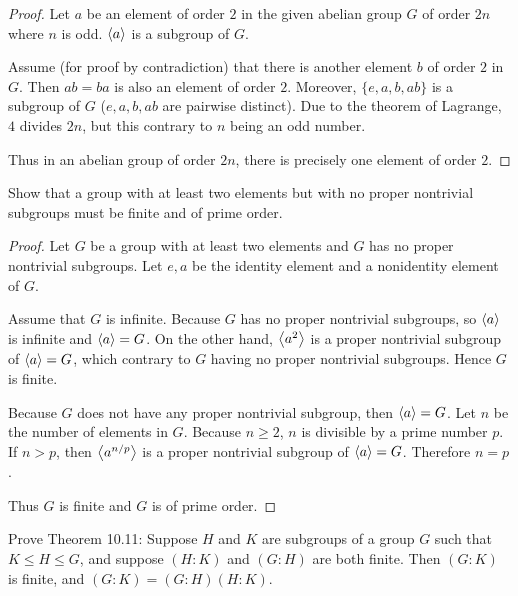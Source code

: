 \begin{proof}
    Let $a$ be an element of order $2$ in the given abelian group $G$ of order $2n$ where $n$ is odd. $\left\langle{a}\right\rangle$ is a subgroup of $G$.

    Assume (for proof by contradiction) that there is another element $b$ of order $2$ in $G$. Then $ab = ba$ is also an element of order $2$. Moreover, $\{ e, a, b, ab \}$ is a subgroup of $G$ ($e, a, b, ab$ are pairwise distinct). Due to the theorem of Lagrange, $4$ divides $2n$, but this contrary to $n$ being an odd number.

    Thus in an abelian group of order $2n$, there is precisely one element of order $2$.
\end{proof}

\newpage
\begin{exercise}
    Show that a group with at least two elements but with no proper nontrivial subgroups must be finite and of prime order.
\end{exercise}

\begin{proof}
    Let $G$ be a group with at least two elements and $G$ has no proper nontrivial subgroups. Let $e, a$ be the identity element and a nonidentity element of $G$.

    Assume that $G$ is infinite. Because $G$ has no proper nontrivial subgroups, so $\left\langle{a}\right\rangle$ is infinite and $\left\langle{a}\right\rangle = G$. On the other hand, $\left\langle{a^{2}}\right\rangle$ is a proper nontrivial subgroup of $\left\langle{a}\right\rangle = G$, which contrary to $G$ having no proper nontrivial subgroups. Hence $G$ is finite.

    Because $G$ does not have any proper nontrivial subgroup, then $\left\langle{a}\right\rangle = G$. Let $n$ be the number of elements in $G$. Because $n\geq 2$, $n$ is divisible by a prime number $p$. If $n > p$, then $\left\langle{a^{n/p}}\right\rangle$ is a proper nontrivial subgroup of $\left\langle{a}\right\rangle = G$. Therefore $n = p$.

    Thus $G$ is finite and $G$ is of prime order.
\end{proof}

\newpage
\begin{exercise}
    Prove Theorem 10.11: Suppose $H$ and $K$ are subgroups of a group $G$ such that $K\leq H\leq G$, and suppose $(H:K)$ and $(G:H)$ are both finite. Then $(G:K)$ is finite, and $(G:K) = (G:H)(H:K)$.
\end{exercise}

